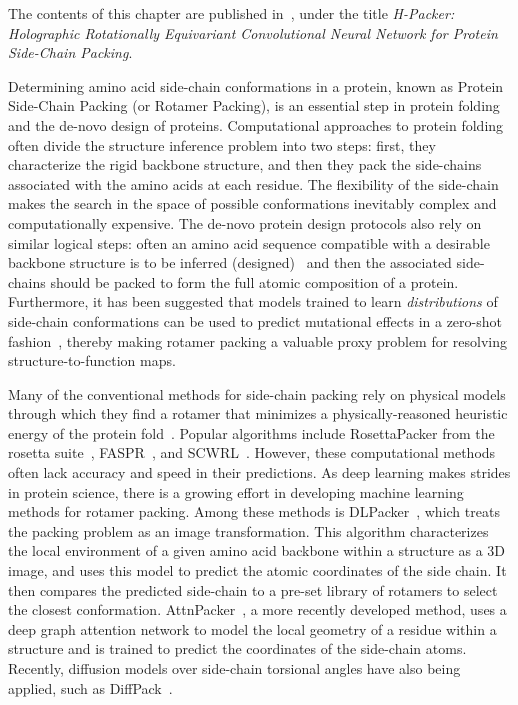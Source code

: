 
The contents of this chapter are published in~\citet{visani_h-packer_2024}, under the title
\textit{H-Packer: Holographic Rotationally Equivariant Convolutional Neural Network for Protein
Side-Chain Packing}.

Determining amino acid side-chain conformations in a protein, known as Protein Side-Chain Packing
(or Rotamer Packing), is an essential step in protein folding and the de-novo design of proteins.
Computational approaches to protein folding often divide the structure inference problem into two
steps: first, they characterize the rigid backbone structure, and then they pack the side-chains
associated with the amino acids at each residue. The flexibility of the side-chain makes the search
in the space of possible conformations inevitably complex and computationally expensive. The
de-novo protein design protocols also rely on similar logical steps: often an amino acid sequence
compatible with a desirable backbone structure is to be inferred
(designed)~\citep{dauparas_robust_2022} and then the associated side-chains should be packed to
form the full atomic composition of a protein. Furthermore, it has been suggested that models
trained to learn \textit{distributions} of side-chain conformations can be used to predict
mutational effects in a zero-shot fashion~\citep{luo_rotamer_2023}, thereby making rotamer packing
a valuable proxy problem for resolving structure-to-function maps.

Many of the conventional methods for side-chain packing rely on physical models through which they
find a rotamer that minimizes a physically-reasoned heuristic energy of the protein
fold~\citep{alford_rosetta_2017, huang_faspr_2020, krivov_improved_2009,
cao_improved_2011, liang_fast_2011}. Popular algorithms include RosettaPacker from the rosetta
suite~\citep{alford_rosetta_2017}, FASPR~\citep{huang_faspr_2020}, and
SCWRL~\citep{krivov_improved_2009}.
However, these computational methods often lack accuracy and speed in their predictions.
As deep learning makes
strides in protein science, there is a growing effort in developing machine learning methods for
rotamer packing. Among these methods is DLPacker~\citep{misiura_dlpacker_2022}, which treats the
packing problem as an image transformation. This algorithm characterizes the local environment of a
given amino acid backbone within a structure as a 3D image, and uses this model to predict the
atomic coordinates of the side chain. It then compares the predicted side-chain to a pre-set
library of rotamers to select the closest conformation. AttnPacker~\citep{mcpartlon_end--end_2023},
a more recently developed method, uses a deep graph attention network to model the local geometry
of a residue within a structure and is trained to predict the coordinates of the side-chain atoms.
Recently, diffusion models over side-chain torsional angles have also being applied, such as
DiffPack~\citep{zhang_diffpack_2023}.

